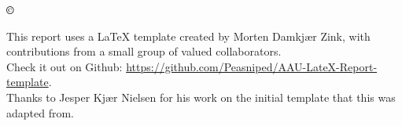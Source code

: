 \thispagestyle{empty}
{\small
\strut\vfill %
\noindent \textbf{\copyright{} \the\year{} \myAuthors}\\
\par
\noindent This report uses a LaTeX template created by Morten Damkjær Zink, with contributions from a small group of valued collaborators.\\
Check it out on Github: \url{https://github.com/Peasniped/AAU-LateX-Report-template}.\\
Thanks to Jesper Kjær Nielsen for his work on the initial template that this was adapted from.\par
\vspace{0.2cm}
\noindent \myColophon
}

\clearpage